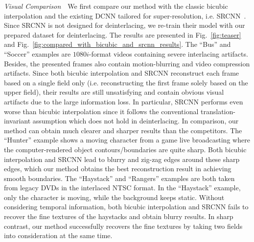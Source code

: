 \vspace{0.15in}
\noindent\emph{Visual Comparison}\,\,\,\,
We first compare our method with the classic bicubic interpolation and the existing DCNN tailored for super-resolution, i.e. SRCNN~\cite{dong2016image}. Since SRCNN is not designed for deinterlacing, we re-train their model with our prepared dataset for deinterlacing. The results are presented in Fig.~\ref{fig:teaser} and Fig.~\ref{fig:compared_with_bicubic_and_srcnn_results}. The ``Bus'' and ``Soccer'' examples are $1080i$-format videos containing severe interlacing artifacts. Besides, the presented frames also contain motion-blurring and video compression artifacts. Since both bicubic interpolation and SRCNN reconstruct each frame based on a single field only (i.e. reconstructing the first frame solely based on the upper field), their results are still unsatisfying and contain obvious visual artifacts due to the large information loss. In particular, SRCNN performs even worse than bicubic interpolation since it follows the conventional translation-invariant assumption which does not hold in deinterlacing. In comparison, our method can obtain much clearer and sharper results than the competitors. The ``Hunter'' example shows a moving character from a game live broadcasting where the computer-rendered object contours/boundaries are quite sharp. Both bicubic interpolation and SRCNN lead to blurry and zig-zag edges around these sharp edges, which our method obtains the best reconstruction result in achieving smooth boundaries. The ``Haystack'' and ``Rangers'' examples are both taken from legacy DVDs in the interlaced NTSC format. In the ``Haystack'' example, only the character is moving, while the background keeps static. Without considering temporal information, both bicubic interpolation and SRCNN fails to recover the fine textures of the haystacks and obtain blurry results. In sharp contrast, our method successfully recovers the fine textures by taking two fields into consideration at the same time.

